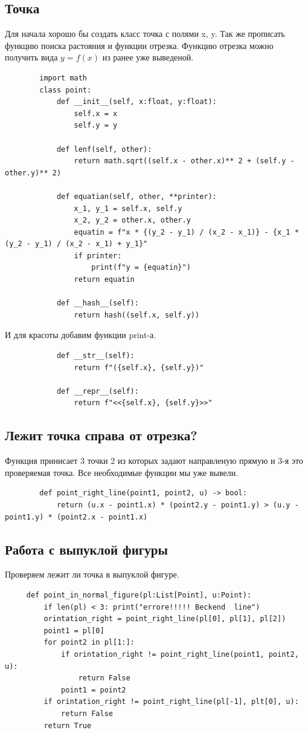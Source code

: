 \documentclass[12pt]{article} %
\begin{document}
 	 \subsection{Точка}
 	 \hspace*{1cm}Для начала хорошо бы создать класс точка с полями x, y. Так же прописать функцию поиска растояния и функции отрезка. Функцию отрезка можно получить вида $y=f(x)$ из ранее уже выведеной.
 	 \begin{verbatim}
 	 	import math
 	 	class point:
 	 	    def __init__(self, x:float, y:float):
 	 	        self.x = x
 	 	        self.y = y
 	 	
 	 	    def lenf(self, other):
 	 	        return math.sqrt((self.x - other.x)** 2 + (self.y - other.y)** 2)
 	 	
 	 	    def equatian(self, other, **printer):
 	 	        x_1, y_1 = self.x, self.y
 	 	        x_2, y_2 = other.x, other.y
 	 	        equatin = f"x * {(y_2 - y_1) / (x_2 - x_1)} - {x_1 * (y_2 - y_1) / (x_2 - x_1) + y_1}"
 	 	        if printer:
 	 	            print(f"y = {equatin}")
 	 	        return equatin
 	 	    
 	 	    def __hash__(self):
 	 	        return hash((self.x, self.y))
 	 \end{verbatim}
 	 И для красоты добавим функции print-а.
 	 \begin{verbatim}
 	 	    def __str__(self):
 	 	        return f"({self.x}, {self.y})"
 	 	    
 	 	    def __repr__(self):
 	 	        return f"<<{self.x}, {self.y}>>"
 	 \end{verbatim}
 	 \subsection{Лежит точка справа от отрезка?}
 	 \hspace*{1cm}Функция принисает 3 точки 2 из которых задают направленую прямую и 3-я это проверяемая точка. Все необходимые функции мы уже вывели.
 	 \begin{verbatim}
 	 	def point_right_line(point1, point2, u) -> bool:
 	 	    return (u.x - point1.x) * (point2.y - point1.y) > (u.y - point1.y) * (point2.x - point1.x)
 	 \end{verbatim}
 	 \subsection{Работа с выпуклой фигуры}
 	 \hspace*{1cm}Проверяем лежит ли точка в выпуклой фигуре. 
 	 \begin{verbatim}
 	 def point_in_normal_figure(pl:List[Point], u:Point):
 	     if len(pl) < 3: print("errore!!!!! Beckend  line")
 	     orintation_right = point_right_line(pl[0], pl[1], pl[2])
 	     point1 = pl[0]
 	     for point2 in pl[1:]:
 	         if orintation_right != point_right_line(point1, point2, u):
 	             return False
 	         point1 = point2
 	     if orintation_right != point_right_line(pl[-1], plt[0], u):
 	         return False
 	     return True
 	 
 	
 	 \end{verbatim}
\end{document}
